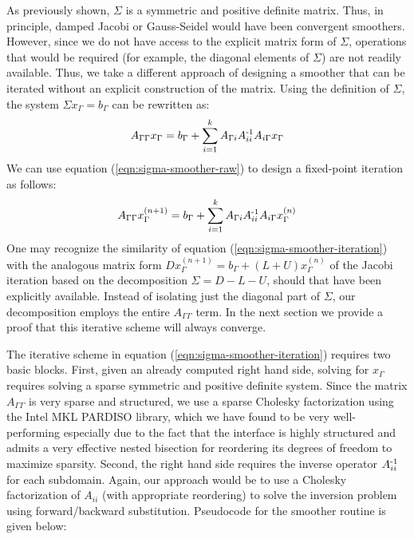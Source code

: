 As previously shown, $\Sigma$ is a symmetric and positive definite matrix. Thus, in principle, damped Jacobi or Gauss-Seidel would have been convergent
smoothers. However, since we do not have access to the explicit matrix form of $\Sigma$, operations that would be required (for example, the diagonal elements of
$\Sigma$) are not readily available. Thus, we take a different approach of designing a smoother that can be iterated without an explicit construction of the matrix.
Using the definition of $\Sigma$, the system $\Sigma x_\Gamma=b_\Gamma$ can be rewritten as:
\begin{eqnarray}
\label{eqn:sigma-smoother-raw}
A_{\Gamma\Gamma}x_\Gamma=b_\Gamma+\sum_{i=1}^k A_{\Gamma i}A_{ii}^{\operatorname{-1}}A_{i \Gamma}x_\Gamma
\end{eqnarray}
We can use equation (\ref{eqn:sigma-smoother-raw}) to design a fixed-point
iteration as follows:
\begin{eqnarray}
\label{eqn:sigma-smoother-iteration}
A_{\Gamma\Gamma}x_\Gamma^{(n+1)}=b_\Gamma+\sum_{i=1}^k A_{\Gamma i}A_{ii}^{\operatorname{-1}}A_{i \Gamma}x_\Gamma^{(n)}
\end{eqnarray}
One may recognize the similarity of equation (\ref{eqn:sigma-smoother-iteration}) with the analogous matrix form $Dx_\Gamma^{(n+1)}\!\!=b_\Gamma+(L+U)x_\Gamma^{(n)}$
of the Jacobi iteration based on the decomposition $\Sigma=D\!-\!L\!-\!U$, should that have been explicitly available.
Instead of isolating just the diagonal part of $\Sigma$, our decomposition employs the entire 
$A_{\Gamma\Gamma}$ term. In the next section we provide a proof that this iterative scheme will always converge.

The iterative scheme in equation (\ref{eqn:sigma-smoother-iteration}) requires two basic blocks. First, given an already computed right hand side, solving for
$x_\Gamma$ requires solving a sparse symmetric and positive definite system. Since the matrix $A_{\Gamma\Gamma}$ is very sparse and structured, we use a sparse
Cholesky factorization using the Intel MKL PARDISO library, which we have found to be very well-performing especially due to the fact that the interface is
highly structured and admits a very effective nested bisection for reordering its degrees of freedom to maximize sparsity. Second, the right hand side requires the
inverse operator $A_{ii}^{\operatorname{-1}}$ for each subdomain. Again, our approach would be to use a Cholesky factorization of $A_{ii}$ (with appropriate reordering)
to solve the inversion problem using forward/backward substitution. Pseudocode for the smoother routine is given below:

